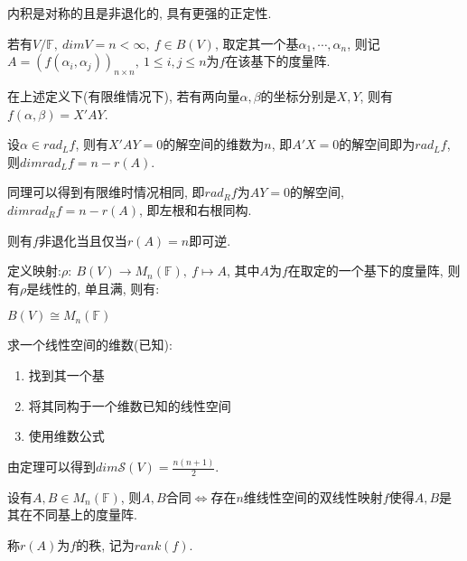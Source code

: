 \begin{example}
    内积是对称的且是非退化的, 具有更强的正定性.
\end{example}

\begin{definition}[度量阵]
    若有$V/\mathbb{F},\ dimV=n<\infty,\ f\in B(V)$, 取定其一个基$\alpha{_1},\cdots,\alpha{_n}$, 
    则记$A=(f(\alpha{_i}, \alpha{_j}))_{n\times n},\ 1\le i,j\le n$为$f$在该基下的度量阵.
\end{definition}

\begin{statement}
    在上述定义下(有限维情况下), 若有两向量$\alpha, \beta$的坐标分别是$X, Y$, 则有$f(\alpha, \beta)=X'AY$.\par
    设$\alpha \in rad_Lf$, 则有$X'AY=0$的解空间的维数为$n$, 即$A'X=0$的解空间即为$rad_Lf$, 则$dimrad_Lf=n-r(A)$.\par
    同理可以得到有限维时情况相同, 即$rad_Rf$为$AY=0$的解空间, $dimrad_Rf=n-r(A)$, 即左根和右根同构.\par
    则有$f$非退化当且仅当$r(A)=n$即可逆.
\end{statement}

\begin{theorem}
    定义映射:$\rho:\ B(V)\to M_n(\mathbb{F}),\ f\mapsto A$, 其中$A$为$f$在取定的一个基下的度量阵, 则有$\rho$是线性的, 单且满, 则有:\par
    $B(V)\cong M_n(\mathbb{F})$
\end{theorem}

\begin{statement}
    求一个线性空间的维数(已知):
    \begin{enumerate}[itemindent=1em]
        \item 找到其一个基
        \item 将其同构于一个维数已知的线性空间
        \item 使用维数公式
    \end{enumerate}
\end{statement}

\begin{example}
    由定理可以得到$dim\mathscr{S}(V)=\frac{n(n+1)}{2}$.
\end{example}

\begin{theorem}[双线性映射的秩]
    设有$A,B\in M_n(\mathbb{F})$, 则$A,B$合同$\Longleftrightarrow$存在$n$维线性空间的双线性映射$f$使得$A,B$是其在不同基上的度量阵.\par
    称$r(A)$为$f$的秩, 记为$rank(f)$.
\end{theorem}

